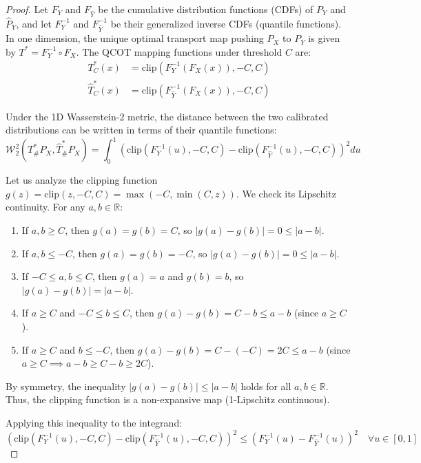 \documentclass{article}
\theoremstyle{plain}
\theoremstyle{definition}
\theoremstyle{remark}
\begin{document}
\begin{proof}
Let $F_Y$ and $F_{\widehat{Y}}$ be the cumulative distribution functions (CDFs) of $P_Y$ and $\widehat{P}_Y$, and let $F_Y^{-1}$ and $F_{\widehat{Y}}^{-1}$ be their generalized inverse CDFs (quantile functions). In one dimension, the unique optimal transport map pushing $P_X$ to $P_Y$ is given by $T^* = F_Y^{-1} \circ F_X$. The QCOT mapping functions under threshold $C$ are:
\begin{align}
    T_C^*(x) &= \text{clip}\left( F_Y^{-1}(F_X(x)), -C, C \right) \\
    \widehat{T}_C^*(x) &= \text{clip}\left( F_{\widehat{Y}}^{-1}(F_X(x)), -C, C \right)
\end{align}

Under the 1D Wasserstein-2 metric, the distance between the two calibrated distributions can be written in terms of their quantile functions:
\begin{equation}
    \mathcal{W}_2^2\left( T^*_{\#} P_X, \widehat{T}^*_{\#} P_X \right) = \int_{0}^{1} \left( \text{clip}(F_Y^{-1}(u), -C, C) - \text{clip}(F_{\widehat{Y}}^{-1}(u), -C, C) \right)^2 du
\end{equation}

Let us analyze the clipping function $g(z) = \text{clip}(z, -C, C) = \max(-C, \min(C, z))$. We check its Lipschitz continuity. For any $a, b \in \mathbb{R}$:
\begin{enumerate}
    \item If $a, b \ge C$, then $g(a) = g(b) = C$, so $|g(a) - g(b)| = 0 \le |a - b|$.
    \item If $a, b \le -C$, then $g(a) = g(b) = -C$, so $|g(a) - g(b)| = 0 \le |a - b|$.
    \item If $-C \le a, b \le C$, then $g(a) = a$ and $g(b) = b$, so $|g(a) - g(b)| = |a - b|$.
    \item If $a \ge C$ and $-C \le b \le C$, then $g(a) - g(b) = C - b \le a - b$ (since $a \ge C$).
    \item If $a \ge C$ and $b \le -C$, then $g(a) - g(b) = C - (-C) = 2C \le a - b$ (since $a \ge C \implies a - b \ge C - b \ge 2C$).
\end{enumerate}
By symmetry, the inequality $|g(a) - g(b)| \le |a - b|$ holds for all $a, b \in \mathbb{R}$. Thus, the clipping function is a non-expansive map (1-Lipschitz continuous).

Applying this inequality to the integrand:
\begin{equation}
    \left( \text{clip}(F_Y^{-1}(u), -C, C) - \text{clip}(F_{\widehat{Y}}^{-1}(u), -C, C) \right)^2 \le \left( F_Y^{-1}(u) - F_{\widehat{Y}}^{-1}(u) \right)^2 \quad \forall u \in [0, 1]
\end{equation}


\end{proof}
\end{document}
